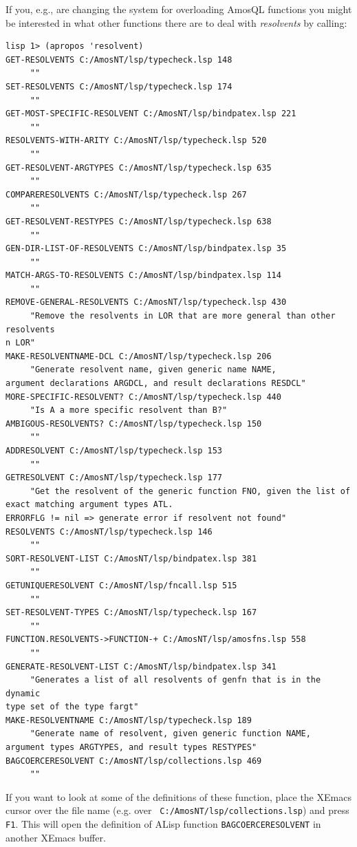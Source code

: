 If you, e.g., are changing the system for overloading AmosQL functions
you might be interested in what other functions there are to deal with
{\em resolvents} by calling:
\begin{verbatim}
lisp 1> (apropos 'resolvent)
GET-RESOLVENTS C:/AmosNT/lsp/typecheck.lsp 148
     ""
SET-RESOLVENTS C:/AmosNT/lsp/typecheck.lsp 174
     ""
GET-MOST-SPECIFIC-RESOLVENT C:/AmosNT/lsp/bindpatex.lsp 221
     ""
RESOLVENTS-WITH-ARITY C:/AmosNT/lsp/typecheck.lsp 520
     ""
GET-RESOLVENT-ARGTYPES C:/AmosNT/lsp/typecheck.lsp 635
     ""
COMPARERESOLVENTS C:/AmosNT/lsp/typecheck.lsp 267
     ""
GET-RESOLVENT-RESTYPES C:/AmosNT/lsp/typecheck.lsp 638
     ""
GEN-DIR-LIST-OF-RESOLVENTS C:/AmosNT/lsp/bindpatex.lsp 35
     ""
MATCH-ARGS-TO-RESOLVENTS C:/AmosNT/lsp/bindpatex.lsp 114
     ""
REMOVE-GENERAL-RESOLVENTS C:/AmosNT/lsp/typecheck.lsp 430
     "Remove the resolvents in LOR that are more general than other resolvents
n LOR"
MAKE-RESOLVENTNAME-DCL C:/AmosNT/lsp/typecheck.lsp 206
     "Generate resolvent name, given generic name NAME,
argument declarations ARGDCL, and result declarations RESDCL"
MORE-SPECIFIC-RESOLVENT? C:/AmosNT/lsp/typecheck.lsp 440
     "Is A a more specific resolvent than B?"
AMBIGOUS-RESOLVENTS? C:/AmosNT/lsp/typecheck.lsp 150
     ""
ADDRESOLVENT C:/AmosNT/lsp/typecheck.lsp 153
     ""
GETRESOLVENT C:/AmosNT/lsp/typecheck.lsp 177
     "Get the resolvent of the generic function FNO, given the list of
exact matching argument types ATL.
ERRORFLG != nil => generate error if resolvent not found"
RESOLVENTS C:/AmosNT/lsp/typecheck.lsp 146
     ""
SORT-RESOLVENT-LIST C:/AmosNT/lsp/bindpatex.lsp 381
     ""
GETUNIQUERESOLVENT C:/AmosNT/lsp/fncall.lsp 515
     ""
SET-RESOLVENT-TYPES C:/AmosNT/lsp/typecheck.lsp 167
     ""
FUNCTION.RESOLVENTS->FUNCTION-+ C:/AmosNT/lsp/amosfns.lsp 558
     ""
GENERATE-RESOLVENT-LIST C:/AmosNT/lsp/bindpatex.lsp 341
     "Generates a list of all resolvents of genfn that is in the dynamic
type set of the type fargt"
MAKE-RESOLVENTNAME C:/AmosNT/lsp/typecheck.lsp 189
     "Generate name of resolvent, given generic function NAME,
argument types ARGTYPES, and result types RESTYPES"
BAGCOERCERESOLVENT C:/AmosNT/lsp/collections.lsp 469
     ""
\end{verbatim}
If you want to look at some of the definitions of these function,
place the XEmacs cursor over the file name (e.g. over {\tt
C:/AmosNT/lsp/collections.lsp}) and press {\tt F1}. This will open the
definition of ALisp function {\tt BAGCOERCERESOLVENT} in another
XEmacs buffer.

